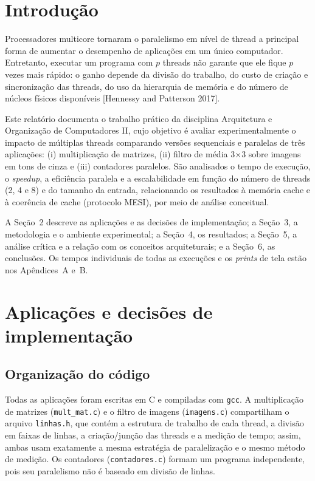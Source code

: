 \documentclass[12pt,a4paper]{article}
\newcommand{\tx}{$\times$}
\begin{document}
\section{Introdução}

Processadores multicore tornaram o paralelismo em nível de thread a principal forma de aumentar o desempenho de aplicações em um único computador. Entretanto, executar um programa com $p$ threads não garante que ele fique $p$ vezes mais rápido: o ganho depende da divisão do trabalho, do custo de criação e sincronização das threads, do uso da hierarquia de memória e do número de núcleos físicos disponíveis [Hennessy and Patterson 2017].

Este relatório documenta o trabalho prático da disciplina Arquitetura e Organização de Computadores II, cujo objetivo é avaliar experimentalmente o impacto de múltiplas threads comparando versões sequenciais e paralelas de três aplicações: (i) multiplicação de matrizes, (ii) filtro de média 3\tx3 sobre imagens em tons de cinza e (iii) contadores paralelos. São analisados o tempo de execução, o \emph{speedup}, a eficiência paralela e a escalabilidade em função do número de threads (2, 4 e 8) e do tamanho da entrada, relacionando os resultados à memória cache e à coerência de cache (protocolo MESI), por meio de análise conceitual.

A Seção~2 descreve as aplicações e as decisões de implementação; a Seção~3, a metodologia e o ambiente experimental; a Seção~4, os resultados; a Seção~5, a análise crítica e a relação com os conceitos arquiteturais; e a Seção~6, as conclusões. Os tempos individuais de todas as execuções e os \emph{prints} de tela estão nos Apêndices~A e~B.

\section{Aplicações e decisões de implementação}

\subsection{Organização do código}

Todas as aplicações foram escritas em C e compiladas com \texttt{gcc}. A multiplicação de matrizes (\texttt{mult\_mat.c}) e o filtro de imagens (\texttt{imagens.c}) compartilham o arquivo \texttt{linhas.h}, que contém a estrutura de trabalho de cada thread, a divisão em faixas de linhas, a criação/junção das threads e a medição de tempo; assim, ambas usam exatamente a mesma estratégia de paralelização e o mesmo método de medição. Os contadores (\texttt{contadores.c}) formam um programa independente, pois seu paralelismo não é baseado em divisão de linhas.
\end{document}
